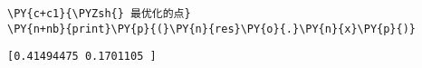     \begin{tcolorbox}[breakable, size=fbox, boxrule=1pt, pad at break*=1mm,colback=cellbackground, colframe=cellborder]
\begin{Verbatim}[commandchars=\\\{\}]
\PY{c+c1}{\PYZsh{} 最优化的点}
\PY{n+nb}{print}\PY{p}{(}\PY{n}{res}\PY{o}{.}\PY{n}{x}\PY{p}{)}
\end{Verbatim}
\end{tcolorbox}

    \begin{Verbatim}[commandchars=\\\{\}]
[0.41494475 0.1701105 ]
    \end{Verbatim}
